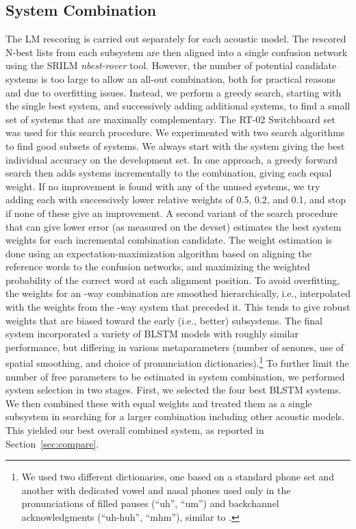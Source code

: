 \documentclass{article}
\begin{document}
\subsection{System Combination}
	\label{sec:combination}
The LM rescoring is carried out separately for each acoustic model.
The rescored N-best lists from each subsystem are then aligned into a single confusion 
network \cite{sri-2000} using the SRILM {\em nbest-rover} tool.
However, the number of potential candidate systems is too large to allow an all-out combination,
both for practical reasons and due to overfitting issues.
Instead, we perform a greedy search, starting with the single best system, and 
successively adding additional systems,
to find a small set of systems that are maximally complementary.
The RT-02 Switchboard set was used for this search procedure.
We experimented with two search algorithms to find good subsets of systems.
We always start with the system giving the best individual accuracy on the development set.
In one approach, a greedy forward search then adds systems incrementally to the combination, giving each equal
weight.  If no improvement is found with any of the unused systems, we try adding each with successively
lower relative weights of 0.5, 0.2, and 0.1, and stop if none of these give an improvement.
A second variant of the search procedure that can give lower error (as measured on the devset)
estimates the best system weights for each incremental combination candidate.
The weight estimation is done using an expectation-maximization algorithm based on aligning the reference words 
to the confusion networks, and maximizing the weighted probability of the correct word at each alignment position.
To avoid overfitting, the weights for an -way combination are smoothed hierarchically, i.e., interpolated with the
weights from the -way system that preceded it.
This tends to give robust weights that are biased toward the early (i.e., better) subsystems.
The final system incorporated a variety of BLSTM models with roughly similar performance,
but differing in various metaparameters
(number of senones, use of spatial smoothing, and choice of pronunciation dictionaries).\footnote{We used two different dictionaries, one based on a standard phone set and another with
dedicated vowel and nasal phones used only in the pronunciations of filled pauses (``uh'', ``um'')
and backchannel acknowledgments (``uh-huh'', ``mhm''), similar to \cite{sri-2000}.}
To further limit the number of free parameters to be estimated in system combination, we performed system selection
in two stages.  First, we selected the four best BLSTM systems.
We then combined these with equal weights and treated them as a single subsystem in searching for
a larger combination including other acoustic models.
This yielded our best overall combined system, as reported in Section~\ref{sec:compare}.
\end{document}
